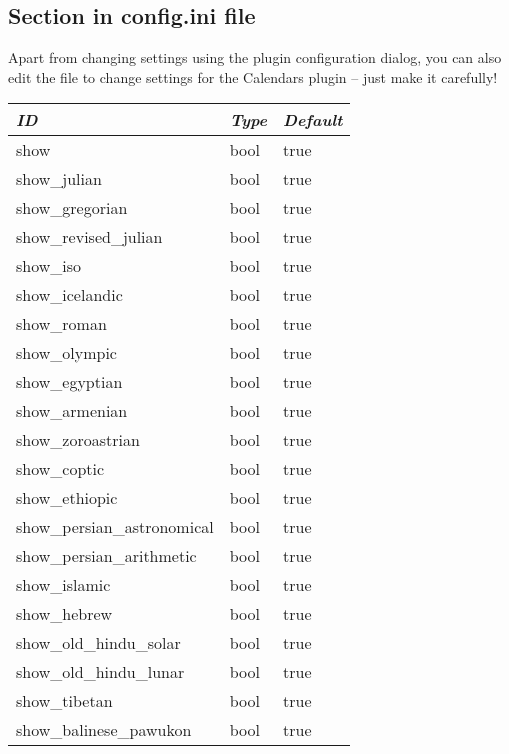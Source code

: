 \subsection*{Section  in config.ini file}

Apart from changing settings using the plugin configuration dialog,
you can also edit the  file to change
settings for the Calendars plugin -- just make it carefully!

\begin{longtable}{l|l|l}\toprule
\emph{ID}                      &\emph{Type} & \emph{Default}  \\\midrule
show                         &bool & true\\\midrule
show\_julian                 &bool & true\\
show\_gregorian              &bool & true\\
show\_revised\_julian        &bool & true\\
show\_iso                    &bool & true\\
show\_icelandic              &bool & true\\\midrule
show\_roman                  &bool & true\\
show\_olympic                &bool & true\\
show\_egyptian               &bool & true\\
show\_armenian               &bool & true\\
show\_zoroastrian            &bool & true\\
show\_coptic                 &bool & true\\
show\_ethiopic               &bool & true\\
show\_persian\_astronomical  &bool & true\\
show\_persian\_arithmetic    &bool & true\\\midrule
show\_islamic                &bool & true\\
show\_hebrew                 &bool & true\\\midrule
show\_old\_hindu\_solar      &bool & true\\
show\_old\_hindu\_lunar      &bool & true\\
show\_tibetan                &bool & true\\
show\_balinese\_pawukon      &bool & true\\\midrule

\end{longtable}
